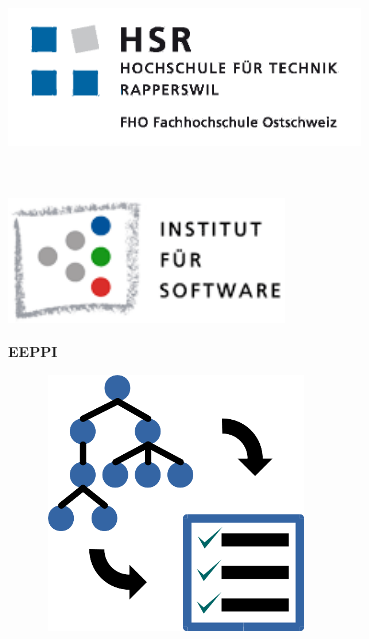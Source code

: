 \begin{titlepage}
	\begin{minipage}{0.5\textwidth}
		\begin{flushleft} \large
			\includegraphics[width=0.7\textwidth]{media/img/logoHSR.png}
		\end{flushleft}
	\end{minipage}
	~
	\begin{minipage}{0.5\textwidth}
		\begin{flushright} \large
			\includegraphics[width=0.55\textwidth]{media/img/ifsLogo.png}
		\end{flushright}
	\end{minipage}
	
	\vspace*{2cm}
	\begin{center}
		{\fontsize{50}{40} \selectfont \textbf{EEPPI} \\[10mm]}
	
		\begin{figure}[H]
			\centering
			\includegraphics[scale=0.40]{media/img/eeppiLogo.png}
		\end{figure}		
		\vspace*{0.5cm}	
	

\end{center}
\end{titlepage}
